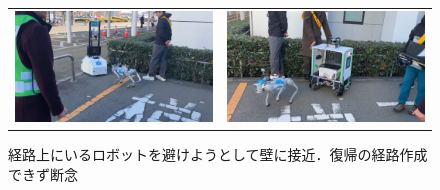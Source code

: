 \begin{figure}[h]
\begin{tabular}{cc}
        \begin{minipage}[b]{0.45\hsize}
            \centering
            \includegraphics[width=\linewidth]{fig/honsoukou3.jpg}
            \caption{追い越したロボット同士で接触しそうになりしばらく停止}
            \label{fig:honsoukou3}
            \end{minipage} &
            \begin{minipage}[b]{0.45\hsize}
            \centering
            \includegraphics[width=\linewidth]{fig/honsoukou4.jpg}
            \caption{経路上にいるロボットを避けようとして壁に接近．復帰の経路作成できず断念}
            \label{fig:honsoukou4}
            \end{minipage}
    \end{tabular}
\end{figure}